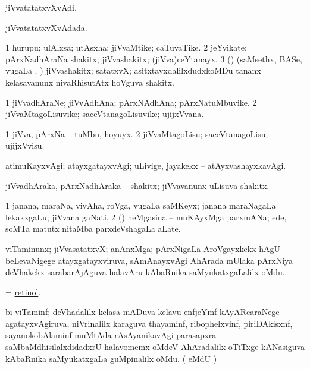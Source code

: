 \bentry 
{} 
\gl{\nA}
\expl{}
\bmng
jiVvatatatxvXvAdi. 
\emng
\eentry

\bentry 
{} 
\gl{\gu}
\expl{}
\bmng
jiVvatatatxvXvAdada. 
\emng
\eentry

\bentry
{} 
\gl{\nA}
\expl{}
\bmng
\bnum
\num{1} hurupu; ulAlxsa; utAsxha; jiVvaMtike; caTuvaTike. 
\num{2} jeYvikate; pArxNadhAraNa shakitx; jiVvashakitx; (jiVva)ceYtanayx. 
\num{3} (\rUpa) (saMsethx, BASe, \mo vugaLa \vi. ) jiVvashakitx; satatxvX; asitxtavxdalilxdudxkoMDu tananx kelasavanunx nivaRhisutAtx hoVguva shakitx. 
\enum
\emng
\eentry

\bentry
{} 
\gl{\nA}
\expl{}
\bmng
\bnum
\num{1} jiVvadhAraNe; jiVvAdhAna; pArxNAdhAna; pArxNatuMbuvike. 
\num{2} jiVvaMtagoLisuvike; saceVtanagoLisuvike; ujijxVvana. 
\enum
\emng
\eentry

\bentry 
{} 
\gl{\sakirx}
\expl{}
\bmng
\bnum
\num{1} jiVva, pArxNa -- tuMbu, hoyuyx. 
\num{2} jiVvaMtagoLisu; saceVtanagoLisu; ujijxVvisu. 
\enum
\emng
\eentry

\bentry 
{} 
\gl{\kirxvi}
\expl{}
\bmng
 atimuKayxvAgi; atayxgatayxvAgi; uLivige, jayakekx -- atAyxvashayxkavAgi. 
\emng
\eentry

\bentry 
{}
\gl{\nA}
\expl{}
\bmng
 jiVvadhAraka, pArxNadhAraka -- shakitx; jiVvavanunx uLisuva shakitx. 
\emng
\eentry

\bentry 
{}
\gl{\nA}
\expl{}
\bmng
\bnum
\num{1} janana, maraNa, vivAha, roVga, \mo vugaLa saMKeyx; janana maraNagaLa lekakxgaLu; jiVvana gaNati. 
\num{2} (\AmA) heMgasina -- muKAyxMga parxmANa; ede, soMTa matutx nitaMba parxdeVshagaLa aLate. 
\enum
\emng
\eentry

\bentry
{} 
\gl{\nA}
\expl{}
\bmng
 viTaminunx; jiVvasatatxvX; anAnxMga; pArxNigaLa AroVgayxkekx hAgU beLevaNigege atayxgatayxviruva, sAmAnayxvAgi AhArada mUlaka pArxNiya deVhakekx sarabarAjAguva halavAru kAbaRnika saMyukatxgaLalilx oMdu. 
\emng
\eentry

\bentry 
{}
\gl{\nA}
\expl{}
\bmng
 = \hyperref{kandict_r.pdf}{R}{retinol}{retinol}. 
\emng
\eentry

\bentry 
{}
\gl{\nA}
\expl{}
\bmng
 bi viTaminf; deVhadalilx kelasa mADuva kelavu enfjeYmf kAyARcaraNege agatayxvAgiruva, niVrinalilx karaguva thayaminf, ribophelxvinf, piriDAkisxnf, sayanokobAlaminf muMtAda rAsAyanikavAgi parasapxra saMbaMdhisilalxdidadxrU halavomemx oMdeV AhAradalilx oTiTxge kANasiguva kAbaRnika saMyukatxgaLa guMpinalilx oMdu. (  eMdU \parx) 
\emng

